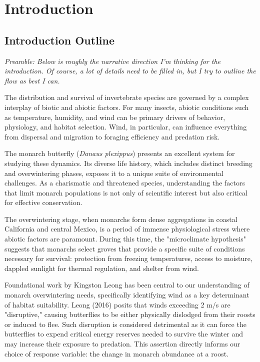 \usepackage{hyperref}
\usepackage{longtable}

\chapter{Introduction}
\label{ch:introduction}

\section{Introduction Outline}

\textit{Preamble: Below is roughly the narrative direction I'm thinking for the introduction. Of course, a lot of details need to be filled in, but I try to outline the flow as best I can.}

The distribution and survival of invertebrate species are governed by a complex interplay of biotic and abiotic factors. For many insects, abiotic conditions such as temperature, humidity, and wind can be primary drivers of behavior, physiology, and habitat selection. Wind, in particular, can influence everything from dispersal and migration to foraging efficiency and predation risk.

The monarch butterfly (\textit{Danaus plexippus}) presents an excellent system for studying these dynamics. Its diverse life history, which includes distinct breeding and overwintering phases, exposes it to a unique suite of environmental challenges. As a charismatic and threatened species, understanding the factors that limit monarch populations is not only of scientific interest but also critical for effective conservation.

The overwintering stage, when monarchs form dense aggregations in coastal California and central Mexico, is a period of immense physiological stress where abiotic factors are paramount. During this time, the "microclimate hypothesis" suggests that monarchs select groves that provide a specific suite of conditions necessary for survival: protection from freezing temperatures, access to moisture, dappled sunlight for thermal regulation, and shelter from wind.

Foundational work by Kingston Leong has been central to our understanding of monarch overwintering needs, specifically identifying wind as a key determinant of habitat suitability. Leong (2016) posits that winds exceeding 2 m/s are "disruptive," causing butterflies to be either physically dislodged from their roosts or induced to flee. Such disruption is considered detrimental as it can force the butterflies to expend critical energy reserves needed to survive the winter and may increase their exposure to predation. This assertion directly informs our choice of response variable: the change in monarch abundance at a roost.


